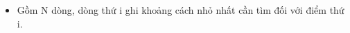 \begin{itemize}
	\item Gồm N dòng, dòng thứ i ghi khoảng cách nhỏ nhất cần tìm đối với điểm thứ i.
\end{itemize}
